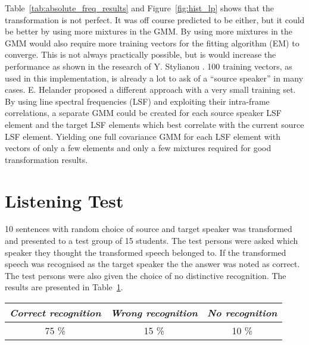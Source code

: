 Table~\ref{tab:absolute_freq_results} and Figure~\ref{fig:hist_lp} shows that the transformation is not perfect. It was off course predicted to be either, but it could be better by using more mixtures in the GMM. By using more mixtures in the GMM would also require more training vectors for the fitting algorithm (EM) to converge. This is not always practically possible, but is would increase the performance as shown in the research of Y. Stylianou \etal \cite{stylianou98}. 100 training vectors, as used in this implementation, is already a lot to ask of a ``source speaker'' in many cases. E. Helander \etal \cite{helander08} proposed a different approach with a very small training set. By using line spectral frequencies (LSF) and exploiting their intra-frame correlations, a separate GMM could be created for each source speaker LSF element and the target LSF elements which best correlate with the current source LSF element. Yielding one full covariance GMM for each LSF element with vectors of only a few elements and only a few mixtures required for good transformation results.

\section{Listening Test} %
\label{sec:listening_test}
10 sentences with random choice of source and target speaker was transformed and presented to a test group of 15 students. The test persons were asked which speaker they thought the transformed speech belonged to. If the transformed speech was recognised as the target speaker the the answer was noted as correct. The test persons were also given the choice of no distinctive recognition. The results are presented in Table~\ref{tab:subjective_listening_results}.
\begin{table}[htbp]
	\begin{center}
		\label{tab:subjective_listening_results}
		\begin{tabular}{ccc}
			\toprule
			\multicolumn{1}{c}{\emph{Correct recognition}} & \multicolumn{1}{c}{\emph{Wrong recognition}} & \multicolumn{1}{c}{\emph{No recognition}}\\
			\midrule
			75 \% & 15 \% & 10 \% \\
			\bottomrule			
		\end{tabular}		
	\end{center}	
\end{table}

